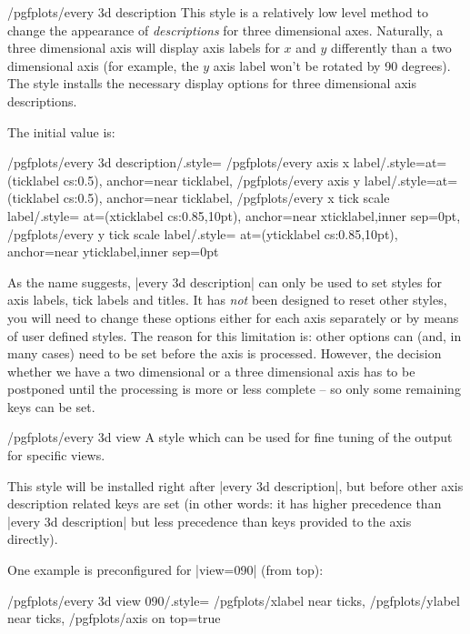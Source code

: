 \begin{stylekey}{/pgfplots/every 3d description}
	This style is a relatively low level method to change the appearance of \emph{descriptions} for three dimensional axes. Naturally, a three dimensional axis will display axis labels for $x$ and $y$ differently  than a two dimensional axis (for example, the $y$ axis label won't be rotated by 90 degrees). The  style installs the necessary display options for three dimensional axis descriptions.

	The initial value is:
\begin{codeexample}
/pgfplots/every 3d description/.style={
	/pgfplots/every axis x label/.style={at={(ticklabel cs:0.5)},
		anchor=near ticklabel},
	/pgfplots/every axis y label/.style={at={(ticklabel cs:0.5)},
		anchor=near ticklabel},
	/pgfplots/every x tick scale label/.style={
		at={(xticklabel cs:0.85,10pt)},
		anchor=near xticklabel,inner sep=0pt},
	/pgfplots/every y tick scale label/.style={
		at={(yticklabel cs:0.85,10pt)},
		anchor=near yticklabel,inner sep=0pt}
}%
\end{codeexample}

	As the name suggests, |every 3d description| can only be used to set styles for axis labels, tick labels and titles. It has \emph{not} been designed to reset other styles, you will need to change these options either for each axis separately or by means of user defined styles. The reason for this limitation is: other options can (and, in many cases) need to be set before the axis is processed. However, the decision whether we have a two dimensional or a three dimensional axis has to be postponed until the processing is more or less complete -- so only some remaining keys can be set.	
\end{stylekey}

\begin{stylekey}{/pgfplots/every 3d view }
	A style which can be used for fine tuning of the output for specific views.

	This style will be installed right after |every 3d description|, but before other axis description related keys are set (in other words: it has higher precedence than |every 3d description| but less precedence than keys provided to the axis directly).

	One example is preconfigured for |view={0}{90}| (from top):
\begin{codeexample}
/pgfplots/every 3d view {0}{90}/.style={
	/pgfplots/xlabel near ticks,
	/pgfplots/ylabel near ticks,
	/pgfplots/axis on top=true
}
\end{codeexample}
\end{stylekey}

